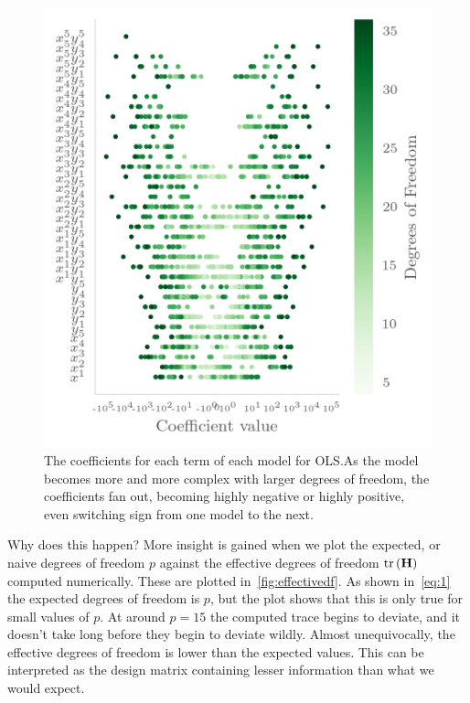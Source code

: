 \begin{figure}[]
  \centering
  \includegraphics[]{figures/olscoeff.png}
  \caption{\label{fig:olscoeff} The coefficients for each term of each model for
  OLS.\@ As the model becomes more and more complex with larger degrees of
  freedom, the coefficients fan out, becoming highly negative or highly positive,
even switching sign from one model to the next. }
\end{figure}

Why does this happen? More insight is gained when we plot the expected, or naive
degrees of freedom \(p\) against the effective degrees of freedom
\(\text{tr}\left(\vb{H}\right)\) computed numerically. These are plotted
in~\cref{fig:effectivedf}. As shown in~\cref{eq:1} the expected degrees of
freedom is \(p\), but the plot shows that this is only true for small values of
\(p\). At around \(p=15\) the computed trace begins to deviate, and it
doesn't take long before they begin to deviate wildly. Almost unequivocally, the
effective degrees of freedom is lower than the expected values. This can be
interpreted as the design matrix containing lesser information than what we
would expect.

